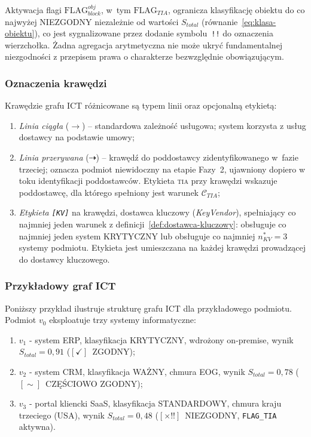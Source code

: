 Aktywacja flagi $\text{FLAG}_{block}^{obj}$, w~tym $\text{FLAG}_{TIA}$, ogranicza klasyfikację obiektu do co najwyżej \textsc{NIEZGODNY} niezależnie od wartości $S_{total}$ (równanie~\eqref{eq:klasa-obiektu}), co jest sygnalizowane przez dodanie symbolu~\texttt{!!} do oznaczenia wierzchołka. Żadna agregacja arytmetyczna nie może ukryć fundamentalnej niezgodności z przepisem prawa o charakterze bezwzględnie obowiązującym.

\subsubsection{Oznaczenia krawędzi}
\label{sec:oznaczenia-krawedzi}

Krawędzie grafu ICT różnicowane są typem linii oraz opcjonalną etykietą:

\begin{enumerate}[label=(\roman*)]
    \item \textit{Linia ciągła} ($\rightarrow$) -- standardowa zależność usługowa; system korzysta z usług dostawcy na podstawie umowy;
    \item \textit{Linia przerywana} ($\dashrightarrow$) -- krawędź do poddostawcy zidentyfikowanego w~fazie trzeciej; oznacza podmiot niewidoczny na etapie Fazy~2, ujawniony dopiero w toku identyfikacji poddostawców. Etykieta \textsc{tia} przy krawędzi wskazuje poddostawcę, dla którego spełniony jest warunek $\mathcal{C}_{TIA}$;
    \item \textit{Etykieta \texttt{[KV]}} na krawędzi, dostawca kluczowy (\textit{KeyVendor}), spełniający co najmniej jeden warunek z definicji~\ref{def:dostawca-kluczowy}: obsługuje co najmniej jeden system KRYTYCZNY lub obsługuje co najmniej $n_{KV}^{*} = 3$ systemy podmiotu. Etykieta jest umieszczana na każdej krawędzi prowadzącej do dostawcy kluczowego.
\end{enumerate}

\subsubsection{Przykładowy graf ICT}
\label{sec:przykladowy-graf}

Poniższy przykład ilustruje strukturę grafu ICT dla przykładowego podmiotu. Podmiot $v_0$ eksploatuje trzy systemy informatyczne:

\begin{enumerate}[label=(\roman*)]
    \item $v_1$ - system ERP, klasyfikacja KRYTYCZNY, wdrożony on-premise, wynik $S_{total} = 0{,}91$ ($[\checkmark]$~ZGODNY);
    \item $v_2$ - system CRM, klasyfikacja WAŻNY, chmura EOG, wynik $S_{total} = 0{,}78$ ($[\sim]$~CZĘŚCIOWO ZGODNY);
    \item $v_3$ - portal kliencki SaaS, klasyfikacja STANDARDOWY, chmura kraju trzeciego (USA), wynik $S_{total} = 0{,}48$ ($[\times!!]$~NIEZGODNY, \texttt{FLAG\_TIA} aktywna).
\end{enumerate}

